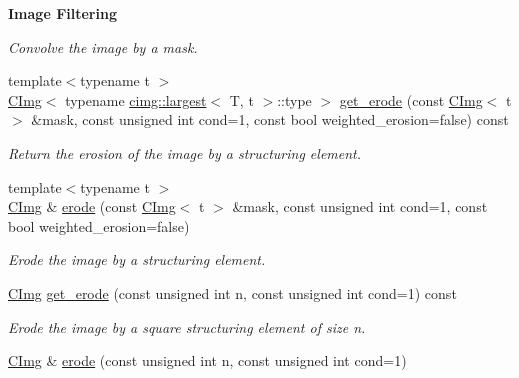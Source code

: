 \begin{Indent}{\bf Image Filtering}
\begin{DoxyCompactItemize}
\begin{DoxyCompactList}\small\item\em Convolve the image by a mask. \item\end{DoxyCompactList}\item 
\hypertarget{structcimg__library_1_1_c_img_a32d2dca663fa590a3a65e97688b110dd}{
{\footnotesize template$<$typename t $>$ }\\\hyperlink{structcimg__library_1_1_c_img}{CImg}$<$ typename \hyperlink{structcimg__library_1_1cimg_1_1largest}{cimg::largest}$<$ T, t $>$::type $>$ \hyperlink{structcimg__library_1_1_c_img_a32d2dca663fa590a3a65e97688b110dd}{get\_\-erode} (const \hyperlink{structcimg__library_1_1_c_img}{CImg}$<$ t $>$ \&mask, const unsigned int cond=1, const bool weighted\_\-erosion=false) const }
\label{structcimg__library_1_1_c_img_a32d2dca663fa590a3a65e97688b110dd}

\begin{DoxyCompactList}\small\item\em Return the erosion of the image by a structuring element. \item\end{DoxyCompactList}\item 
{\footnotesize template$<$typename t $>$ }\\\hyperlink{structcimg__library_1_1_c_img}{CImg} \& \hyperlink{structcimg__library_1_1_c_img_a73a35f338fc6648d908ed69a50021d42}{erode} (const \hyperlink{structcimg__library_1_1_c_img}{CImg}$<$ t $>$ \&mask, const unsigned int cond=1, const bool weighted\_\-erosion=false)
\begin{DoxyCompactList}\small\item\em Erode the image by a structuring element. \item\end{DoxyCompactList}\item 
\hypertarget{structcimg__library_1_1_c_img_aca876e6dbc38df15c944ee60903742ef}{
\hyperlink{structcimg__library_1_1_c_img}{CImg} \hyperlink{structcimg__library_1_1_c_img_aca876e6dbc38df15c944ee60903742ef}{get\_\-erode} (const unsigned int n, const unsigned int cond=1) const }
\label{structcimg__library_1_1_c_img_aca876e6dbc38df15c944ee60903742ef}

\begin{DoxyCompactList}\small\item\em Erode the image by a square structuring element of size n. \item\end{DoxyCompactList}\item 
\hypertarget{structcimg__library_1_1_c_img_a694d451f82c9532088ff0906d427e343}{
\hyperlink{structcimg__library_1_1_c_img}{CImg} \& \hyperlink{structcimg__library_1_1_c_img_a694d451f82c9532088ff0906d427e343}{erode} (const unsigned int n, const unsigned int cond=1)}
\label{structcimg__library_1_1_c_img_a694d451f82c9532088ff0906d427e343}


\end{DoxyCompactItemize}
\end{Indent}
